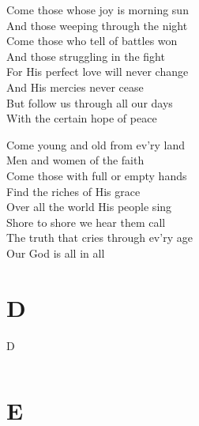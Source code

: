 \documentclass{beamer}
\begin{document}
{\begin{frame}{}
Come those whose joy is morning sun\\ 
And those weeping through the night\\ 
Come those who tell of battles won\\ 
And those struggling in the fight\\ 
For His perfect love will never change\\ 
And His mercies never cease\\ 
But follow us through all our days\\ 
With the certain hope of peace 

\end{frame}

\hypertarget{Come, people of the Risen King[]3}{}
\begin{frame}{}
\fontsize{ 18 }{ 23 }\selectfont

Come young and old from ev'ry land\\ 
Men and women of the faith\\ 
Come those with full or empty hands\\ 
Find the riches of His grace\\ 
Over all the world His people sing\\ 
Shore to shore we hear them call\\ 
The truth that cries through ev'ry age\\ 
Our God is all in all 

\end{frame}

}
 
\section{D}

\begin{frame}{D}
\begin{columns}

    


    


\end{columns}

\end{frame}

\section{E}
\end{document}
